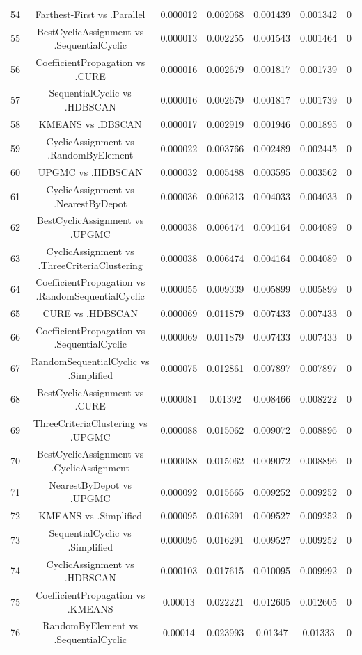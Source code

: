 \documentclass[a4paper,10pt]{article}
\begin{document}
\begin{landscape}
\begin{table}[!htp]
\begin{tabular}{ccccccc}
54&Farthest-First vs .Parallel&0.000012&0.002068&0.001439&0.001342&0\\
55&BestCyclicAssignment vs .SequentialCyclic&0.000013&0.002255&0.001543&0.001464&0\\
56&CoefficientPropagation vs .CURE&0.000016&0.002679&0.001817&0.001739&0\\
57&SequentialCyclic vs .HDBSCAN&0.000016&0.002679&0.001817&0.001739&0\\
58&KMEANS vs .DBSCAN&0.000017&0.002919&0.001946&0.001895&0\\
59&CyclicAssignment vs .RandomByElement&0.000022&0.003766&0.002489&0.002445&0\\
60&UPGMC vs .HDBSCAN&0.000032&0.005488&0.003595&0.003562&0\\
61&CyclicAssignment vs .NearestByDepot&0.000036&0.006213&0.004033&0.004033&0\\
62&BestCyclicAssignment vs .UPGMC&0.000038&0.006474&0.004164&0.004089&0\\
63&CyclicAssignment vs .ThreeCriteriaClustering&0.000038&0.006474&0.004164&0.004089&0\\
64&CoefficientPropagation vs .RandomSequentialCyclic&0.000055&0.009339&0.005899&0.005899&0\\
65&CURE vs .HDBSCAN&0.000069&0.011879&0.007433&0.007433&0\\
66&CoefficientPropagation vs .SequentialCyclic&0.000069&0.011879&0.007433&0.007433&0\\
67&RandomSequentialCyclic vs .Simplified&0.000075&0.012861&0.007897&0.007897&0\\
68&BestCyclicAssignment vs .CURE&0.000081&0.01392&0.008466&0.008222&0\\
69&ThreeCriteriaClustering vs .UPGMC&0.000088&0.015062&0.009072&0.008896&0\\
70&BestCyclicAssignment vs .CyclicAssignment&0.000088&0.015062&0.009072&0.008896&0\\
71&NearestByDepot vs .UPGMC&0.000092&0.015665&0.009252&0.009252&0\\
72&KMEANS vs .Simplified&0.000095&0.016291&0.009527&0.009252&0\\
73&SequentialCyclic vs .Simplified&0.000095&0.016291&0.009527&0.009252&0\\
74&CyclicAssignment vs .HDBSCAN&0.000103&0.017615&0.010095&0.009992&0\\
75&CoefficientPropagation vs .KMEANS&0.00013&0.022221&0.012605&0.012605&0\\
76&RandomByElement vs .SequentialCyclic&0.00014&0.023993&0.01347&0.01333&0\\

\end{tabular}
\end{table}
\end{landscape}
\end{document}
